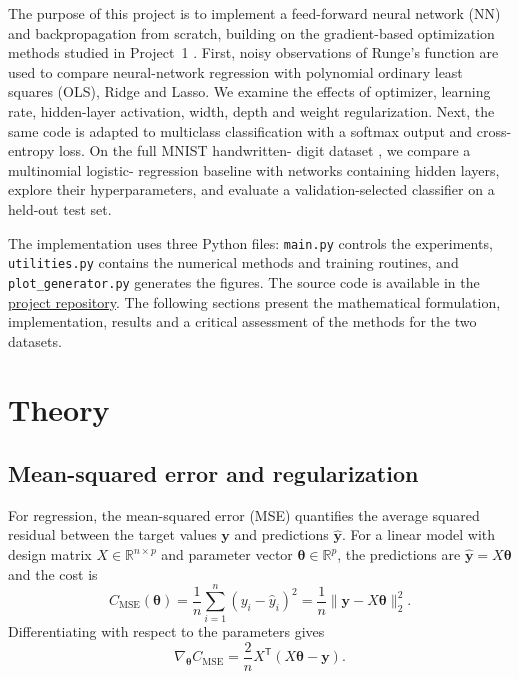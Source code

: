 \documentclass[aps,rmp,reprint,amsmath,amssymb,graphicx,longbibliography]{revtex4-1}
\begin{document}
The purpose of this project is to implement a feed-forward neural network (NN)
and backpropagation from scratch, building on the gradient-based optimization
methods studied in Project~1 \cite{Project_1}. First, noisy observations of
Runge's function are used to compare neural-network regression with polynomial
ordinary least squares (OLS), Ridge and Lasso. We examine the effects of
optimizer, learning rate, hidden-layer activation, width, depth and weight
regularization. Next, the same code is adapted to multiclass classification
with a softmax output and cross-entropy loss. On the full MNIST handwritten-
digit dataset \cite{lecun2010mnist}, we compare a multinomial logistic-
regression baseline with networks containing hidden layers, explore their
hyperparameters, and evaluate a validation-selected classifier on a held-out
test set.

The implementation uses three Python files: \texttt{main.py} controls the
experiments, \texttt{utilities.py} contains the numerical methods and training
routines, and \texttt{plot\_generator.py} generates the figures. The source
code is available in the
\href{https://github.uio.no/teresm/Machine-Learning/tree/main/P2}{project repository}.
The following sections present the mathematical formulation, implementation,
results and a critical assessment of the methods for the two datasets.


\section{Theory}


\subsection{Mean-squared error and regularization}
\label{subsec:mse_gradients}

For regression, the mean-squared error (MSE) quantifies the average squared
residual between the target values $\mathbf{y}$ and predictions
$\hat{\mathbf{y}}$. For a linear model with design matrix
$X\in\mathbb{R}^{n\times p}$ and parameter vector
$\boldsymbol{\theta}\in\mathbb{R}^{p}$, the predictions are
$\hat{\mathbf{y}}=X\boldsymbol{\theta}$ and the cost is \cite{Book_Ch3}
\begin{equation}
    C_{\mathrm{MSE}}(\boldsymbol{\theta})
    =\frac{1}{n}\sum_{i=1}^{n}(y_i-\hat y_i)^2
    =\frac{1}{n}\|\mathbf{y}-X\boldsymbol{\theta}\|_2^2.
    \label{eq:MSE}
\end{equation}
Differentiating with respect to the parameters gives
\begin{equation}
    \nabla_{\boldsymbol{\theta}}C_{\mathrm{MSE}}
    =\frac{2}{n}X^{\mathsf T}(X\boldsymbol{\theta}-\mathbf{y}).
\end{equation}
\end{document}
